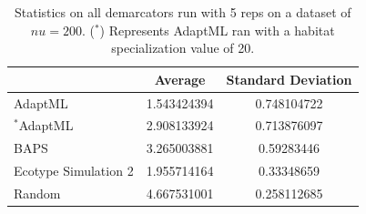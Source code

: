 \begin{table}
\begin{tabular}{l|cc}
    ~                    & Average     & Standard Deviation \\ \hline
    AdaptML              & 1.543424394 & 0.748104722        \\
    $^\ast$AdaptML              & 2.908133924 & 0.713876097        \\
    BAPS                 & 3.265003881 & 0.59283446         \\
    Ecotype Simulation 2 & 1.955714164 & 0.33348659         \\
    Random               & 4.667531001 & 0.258112685        \\
    \end{tabular}
    \caption[Statistics on all demarcators on $nu=200$.]{Statistics on all demarcators run with 5 reps on a dataset of $nu=200$. ($^\ast$) Represents AdaptML ran with a habitat specialization value of 20.}
        \label{tab:200Allmean}
\end{table}